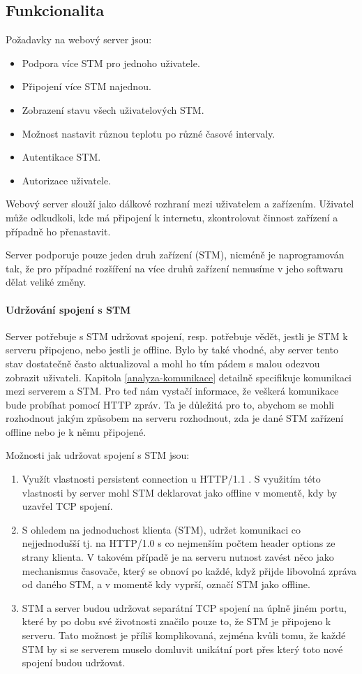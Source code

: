 
\subsection{Funkcionalita}
Požadavky na webový server jsou:
\begin{itemize}
  \item Podpora více STM pro jednoho uživatele.
  \item Připojení více STM najednou.
  \item Zobrazení stavu všech uživatelových STM.
  \item Možnost nastavit různou teplotu po různé časové intervaly.
  \item Autentikace STM.
  \item Autorizace uživatele.
\end{itemize}
Webový server slouží jako dálkové rozhraní mezi uživatelem a zařízením.
Uživatel může odkudkoli, kde má připojení k internetu, zkontrolovat činnost zařízení
a případně ho přenastavit.

Server podporuje pouze jeden druh zařízení (STM), nicméně je naprogramován
tak, že pro případné rozšíření na více druhů zařízení nemusíme v jeho softwaru dělat veliké změny.

\paragraph{Udržování spojení s STM}
Server potřebuje s STM udržovat spojení, resp. potřebuje vědět, jestli je STM k serveru připojeno,
nebo jestli je offline.
Bylo by také vhodné, aby server tento stav dostatečně často aktualizoval a mohl ho tím pádem s malou
odezvou zobrazit uživateli.
Kapitola \ref{analyza-komunikace} detailně specifikuje komunikaci mezi serverem a STM.
Pro teď nám vystačí informace, že veškerá komunikace bude probíhat pomocí HTTP zpráv.
Ta je důležitá pro to, abychom se mohli rozhodnout jakým způsobem na serveru rozhodnout, zda je dané
STM zařízení offline nebo je k němu připojené.

Možnosti jak udržovat spojení s STM jsou:
\begin{enumerate}
  \item Využít vlastnosti persistent connection u HTTP/1.1 \cite{HTTP-persistent-connection}.
    S využitím této vlastnosti by server mohl STM deklarovat jako offline v momentě, kdy by uzavřel
    TCP spojení.
  \item S ohledem na jednoduchost klienta (STM), udržet komunikaci co nejjednodušší tj.
    na HTTP/1.0 s co nejmenším počtem header options ze strany klienta.
    V takovém případě je na serveru nutnost zavést něco jako mechanismus časovače, který se obnoví po každé,
    když přijde libovolná zpráva od daného STM, a v momentě kdy vyprší, označí STM jako offline.
  \item STM a server budou udržovat separátní TCP spojení na úplně jiném portu, které
    by po dobu své životnosti značilo pouze to, že STM je připojeno k serveru.
    Tato možnost je příliš komplikovaná, zejména kvůli tomu, že každé STM by si se serverem muselo domluvit
    unikátní port přes který toto nové spojení budou udržovat.
\end{enumerate}

